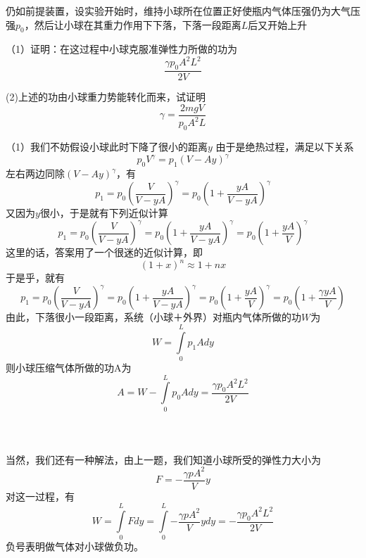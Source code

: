 \documentclass[lang=cn,10pt]{elegantbook}
\begin{document}
	\begin{example}
		仍如前提装置，设实验开始时，维持小球所在位置正好使瓶内气体压强仍为大气压强$p_{0}$，然后让小球在其重力作用下下落，下落一段距离$L$后又开始上升
		
		（1）证明：在这过程中小球克服准弹性力所做的功为
		\begin{equation*}
			\frac{\gamma p_{0}A^{2}L^{2}}{2V}
		\end{equation*}
		
		(2)上述的功由小球重力势能转化而来，试证明
		\begin{equation*}
			\gamma=\frac{2mgV}{p_{0}A^{2}L}
		\end{equation*}
		
		
	\end{example}
	\begin{solution}
		（1）我们不妨假设小球此时下降了很小的距离$y$
		由于是绝热过程，满足以下关系
		\begin{equation*}
			p_{0}V^{\gamma}=p_{1}(V-Ay)^{\gamma}
		\end{equation*}
		左右两边同除$(V-Ay)^{\gamma}$，有
		\begin{equation*}
			p_1=p_0\left( \frac{V}{V-yA} \right) ^{\gamma}=p_0\left( 1+\frac{yA}{V-yA} \right) ^{\gamma}
		\end{equation*}
		又因为$y$很小，于是就有下列近似计算
			\begin{equation*}
			p_1=p_0\left( \frac{V}{V-yA} \right) ^{\gamma}=p_0\left( 1+\frac{yA}{V-yA} \right) ^{\gamma}=p_0\left( 1+\frac{yA}{V} \right) ^{\gamma}
		\end{equation*}
		这里的话，答案用了一个很迷的近似计算，即
		\begin{equation*}
			(1+x)^{n}\approx1+nx
		\end{equation*}
		于是乎，就有
		\begin{equation*}
			p_1=p_0\left( \frac{V}{V-yA} \right) ^{\gamma}=p_0\left( 1+\frac{yA}{V-yA} \right) ^{\gamma}=p_0\left( 1+\frac{yA}{V} \right) ^{\gamma}=p_0\left( 1+\frac{\gamma yA}{V} \right) 
		\end{equation*}
		由此，下落很小一段距离，系统（小球＋外界）对瓶内气体所做的功$W$为
		\begin{equation*}
			W=\int\limits_0^L{p_{1}Ady}
		\end{equation*}
		则小球压缩气体所做的功A为
		\begin{equation*}
			A=W-\int\limits_0^L{p_{0}Ady}=	\frac{\gamma p_{0}A^{2}L^{2}}{2V}
		\end{equation*}
		~\\
		~\\
		~\\
		当然，我们还有一种解法，由上一题，我们知道小球所受的弹性力大小为
		\begin{equation*}
			F=-\frac{\gamma p A^{2}}{V}y
		\end{equation*}
		对这一过程，有
		\begin{equation*}
			W=\int\limits_0^L{Fdy}=\int\limits_0^L{-\frac{\gamma p A^{2}}{V}ydy}=-\frac{\gamma p_{0}A^{2}L^{2}}{2V}
		\end{equation*}
		负号表明做气体对小球做负功。
		

\end{solution}
\end{document}
